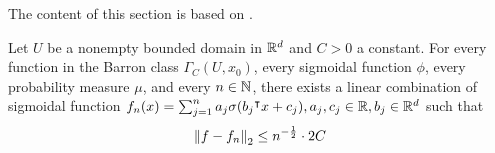 The content of this section is based on
\cite{barronUniversalApproximationBounds1993}.



\begin{theorem}
    \label{thm:barron_1993_1}
    Let $U$ be a nonempty bounded domain in $\mathbb{R}^d$ and $C > 0$ a constant. For
    every function in the Barron class $\Gamma_C(U, x_0)$, every sigmoidal
    function $\phi$, every probability measure $\mu$, and every $n \in \mathbb{N}$,
    there exists a linear combination of sigmoidal function $f_n(x) =
    \sum_{j=1}^n a_j \sigma(b_j{}^{\intercal} x+c_j), a_j, c_j \in \mathbb{R}, b_j \in \mathbb{R}^d$ such
    that
    \begin{equation}
        \left\| f - f_n \right\|_2 \leq n^{-\frac{1}{2}} \cdot 2C
    \end{equation}
\end{theorem}

